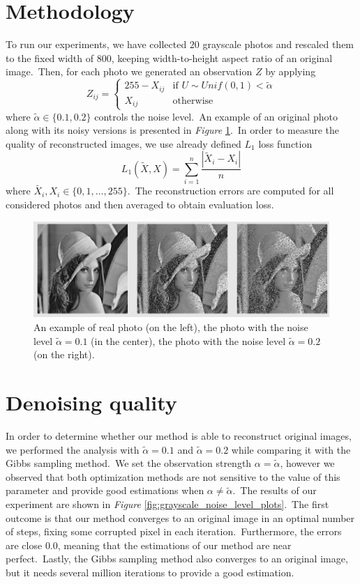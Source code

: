 \documentclass[a4paper, 11pt, onecolumn, openany, titlepage]{report}
\theoremstyle{default_theorem_style}\newtheorem{theorem}{Theorem}
\theoremstyle{default_theorem_style}\newtheorem{definition}{Definition}
\begin{document}
\section{Methodology}

To run our experiments, we have collected $20$ grayscale photos and rescaled them to the fixed width of $800$,
keeping width-to-height aspect ratio of an original image.\ Then, for each photo we generated an
observation $Z$ by applying
$$
Z_{ij} =
\begin{cases}
  255 - X_{ij} &\text{if $U \sim Unif(0, 1) < \tilde{\alpha}$}\\
  X_{ij} &\text{otherwise}
\end{cases}
$$
where $\tilde{\alpha} \in \{0.1, 0.2\}$ controls the noise level.\ An example of an original photo along with
its noisy versions is presented in \textit{Figure} \ref{fig:grayscale_data_examples}.\ In order to
measure the quality of reconstructed images, we use already defined $L_1$ loss function
$$
L_1(\tilde{X}, X) = \sum\limits_{i = 1}^n \frac{|\tilde{X}_i - X_i|}{n}
$$
where $\tilde{X_i}, X_i \in \{0, 1,  \dots, 255\}$.\ The reconstruction errors are computed for all considered
photos and then averaged to obtain evaluation loss.

\begin{figure}[H]
\centering
\includegraphics[scale=0.46]{grayscale_data_examples}
\caption{An example of real photo (on the left), the photo with the noise level $\tilde{\alpha} = 0.1$
(in the center), the photo with the noise level $\tilde{\alpha} = 0.2$ (on the right).}
\label{fig:grayscale_data_examples}
\end{figure}

\section{Denoising quality}

In order to determine whether our method is able to reconstruct original images, we performed the analysis with
$\tilde{\alpha} = 0.1$ and $\tilde{\alpha} = 0.2$ while comparing it with the Gibbs sampling method.\ We set
the observation strength $\alpha = \tilde{\alpha}$, however we observed that both optimization methods are not
sensitive to the value of this parameter and provide good estimations when $\alpha \neq \tilde{\alpha}$.\ The
results of our experiment are shown in \textit{Figure} \ref{fig:grayscale_noise_level_plots}.\ The first outcome
is that our method converges to an original image in an optimal number of steps, fixing some corrupted pixel in each
iteration.\ Furthermore, the errors are close $0.0$, meaning that the estimations of our method are near
perfect.\ Lastly, the Gibbs sampling method also converges to an original image, but it needs several million
iterations to provide a good estimation.
\end{document}
